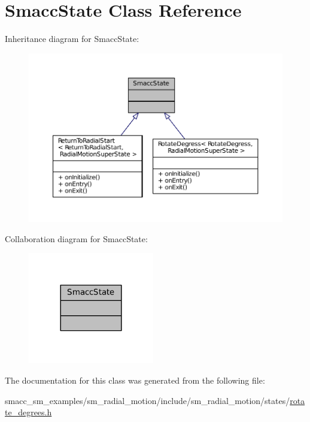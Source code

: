 \hypertarget{classSmaccState}{}\section{Smacc\+State Class Reference}
\label{classSmaccState}


Inheritance diagram for Smacc\+State\+:
\nopagebreak
\begin{figure}[H]
\begin{center}
\leavevmode
\includegraphics[width=350pt]{classSmaccState__inherit__graph}
\end{center}
\end{figure}


Collaboration diagram for Smacc\+State\+:
\nopagebreak
\begin{figure}[H]
\begin{center}
\leavevmode
\includegraphics[width=156pt]{classSmaccState__coll__graph}
\end{center}
\end{figure}


The documentation for this class was generated from the following file\+:\begin{DoxyCompactItemize}
\item 
smacc\+\_\+sm\+\_\+examples/sm\+\_\+radial\+\_\+motion/include/sm\+\_\+radial\+\_\+motion/states/\hyperlink{rotate__degrees_8h}{rotate\+\_\+degrees.\+h}\end{DoxyCompactItemize}
